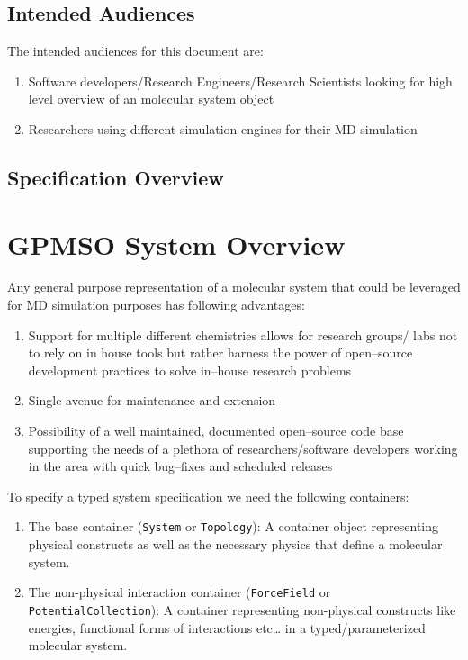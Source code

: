 \documentclass[12pt]{article}
\begin{document}
\subsection{Intended Audiences}
The intended audiences for this document are:

\begin{enumerate}
    \item Software developers/Research Engineers/Research Scientists looking for high level overview of an molecular system object
    \item Researchers using different simulation engines for their MD simulation
\end{enumerate}

\subsection{Specification Overview}

\pagebreak
\section{GPMSO System Overview}
Any general purpose representation of a molecular system that could be leveraged for MD simulation purposes has following advantages:
\begin{enumerate}
    \item Support for multiple different chemistries allows for research groups/ labs not to rely on in house tools but rather harness the power of open--source development practices to solve in--house research problems
    \item Single avenue for maintenance and extension
    \item Possibility of a well maintained, documented open--source code base supporting the needs of a plethora of researchers/software developers working in the area with quick bug--fixes and scheduled releases
\end{enumerate}

To specify a typed system specification we need the following containers:

\begin{enumerate}
    \item The base container (\texttt{System} or \texttt{Topology}): A container object representing physical constructs as well as the necessary physics that define a molecular system.

    \item The non-physical interaction container (\texttt{ForceField} or \texttt{PotentialCollection}): A container representing non-physical constructs like energies, functional forms of interactions etc… in a typed/parameterized molecular system.
\end{enumerate}
\end{document}

